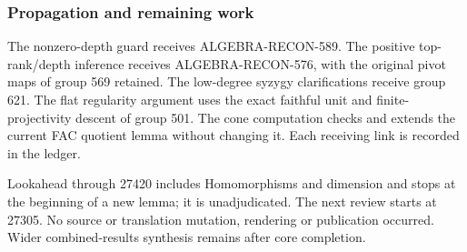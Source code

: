 \subsubsection{Propagation and remaining work}\label{algebra-proof-023-propagation-and-remaining-work}

The nonzero-depth guard receives ALGEBRA-RECON-589. The positive top-rank/depth inference receives ALGEBRA-RECON-576, with the original pivot maps of group 569 retained. The low-degree syzygy clarifications receive group 621. The flat regularity argument uses the exact faithful unit and finite-projectivity descent of group 501. The cone computation checks and extends the current FAC quotient lemma without changing it. Each receiving link is recorded in the ledger.

Lookahead through 27420 includes Homomorphisms and dimension and stops at the beginning of a new lemma; it is unadjudicated. The next review starts at 27305. No source or translation mutation, rendering or publication occurred. Wider combined-results synthesis remains after core completion.
